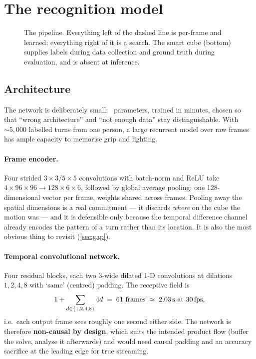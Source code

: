 \section{The recognition model}
\label{sec:model}

\begin{figure}[t]
\centering

\caption{The pipeline. Everything left of the dashed line is per-frame and
learned; everything right of it is a search. The smart cube (bottom) supplies
labels during data collection and ground truth during evaluation, and is
absent at inference.}
\label{fig:pipeline}
\end{figure}

\subsection{Architecture}
\label{sec:arch}

The network is deliberately small: \NParams\ parameters, trained in minutes,
chosen so that ``wrong architecture'' and ``not enough data'' stay
distinguishable. With ${\sim}5{,}000$ labelled turns from one person, a large
recurrent model over raw frames has ample capacity to memorise grip and
lighting.

\paragraph{Frame encoder.} Four strided $3\times3$/$5\times5$ convolutions
with batch-norm and ReLU take $4\times96\times96 \rightarrow 128\times6\times6$,
followed by global average pooling: one 128-dimensional vector per frame,
weights shared across frames. Pooling away the spatial dimensions is a real
commitment --- it discards \emph{where} on the cube the motion was --- and it
is defensible only because the temporal difference channel already encodes
the pattern of a turn rather than its location. It is also the most obvious
thing to revisit (\cref{sec:gap}).

\paragraph{Temporal convolutional network.} Four residual blocks, each two
$3$-wide dilated 1-D convolutions at dilations $1,2,4,8$ with `same' (centred)
padding. The receptive field is
\begin{equation}
1 + \sum_{d\in\{1,2,4,8\}} 4d \;=\; 61 \text{ frames} \;\approx\; 2.03\,\text{s
at 30\,fps,}
\end{equation}
i.e.\ each output frame sees roughly one second either side. The network is
therefore \textbf{non-causal by design}, which suits the intended product
flow (buffer the solve, analyse it afterwards) and would need causal padding
and an accuracy sacrifice at the leading edge for true streaming.


